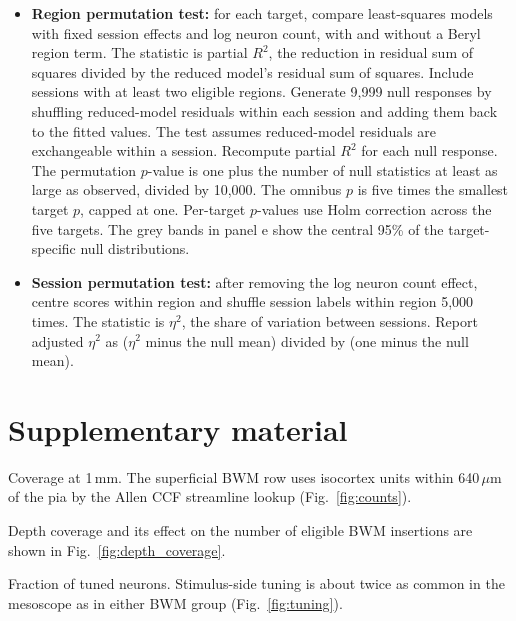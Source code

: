 \documentclass[10pt]{article}
\newcommand{\um}{\,$\mu$m}
\newcommand{\figref}[1]{Fig.~\ref{fig:#1}}
\begin{document}
\begin{itemize}
  \item \textbf{Region permutation test:} for each target, compare least-squares models with fixed session effects and log neuron count, with and without a Beryl region term. The statistic is partial $R^2$, the reduction in residual sum of squares divided by the reduced model's residual sum of squares. Include sessions with at least two eligible regions. Generate 9{,}999 null responses by shuffling reduced-model residuals within each session and adding them back to the fitted values. The test assumes reduced-model residuals are exchangeable within a session. Recompute partial $R^2$ for each null response. The permutation $p$-value is one plus the number of null statistics at least as large as observed, divided by 10{,}000. The omnibus $p$ is five times the smallest target $p$, capped at one. Per-target $p$-values use Holm correction across the five targets. The grey bands in panel e show the central 95\% of the target-specific null distributions.
  \item \textbf{Session permutation test:} after removing the log neuron count effect, centre scores within region and shuffle session labels within region 5{,}000 times. The statistic is $\eta^2$, the share of variation between sessions. Report adjusted $\eta^2$ as ($\eta^2$ minus the null mean) divided by (one minus the null mean).
\end{itemize}


\clearpage
\section*{Supplementary material}
\setcounter{figure}{0}
\renewcommand{\thefigure}{S\arabic{figure}}
\setcounter{table}{0}
\renewcommand{\thetable}{S\arabic{table}}



Coverage at 1\,mm. The superficial BWM row uses isocortex units within 640\um{} of the pia by the Allen CCF streamline lookup (\figref{counts}).



Depth coverage and its effect on the number of eligible BWM insertions are shown in \figref{depth_coverage}.



Fraction of tuned neurons. Stimulus-side tuning is about twice as common in the mesoscope as in either BWM group (\figref{tuning}).


\end{document}
